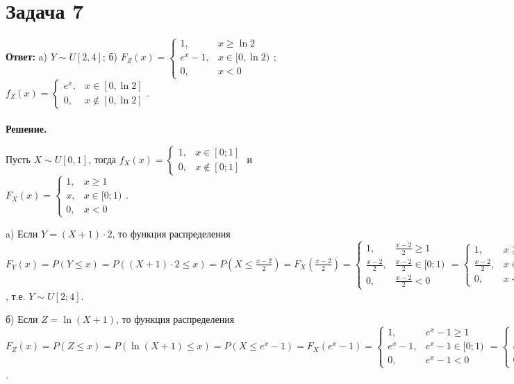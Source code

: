 \documentclass{article}
\begin{document}
\section*{Задача 7}
{\bf Ответ: } a) $Y\sim U[2,4]$; б) $F_Z(x)=\begin{cases}1,&x \geq \ln 2\\e^x-1,&x\in [0, \ln 2)\\0, &x < 0\end{cases}$; $f_Z(x)=\begin{cases}e^x,&x\in [0, \ln 2]\\0,&x \notin [0, \ln 2]\end{cases}$.
\\
\\
{\bf Решение.}
\par
Пусть $X\sim U[0,1]$, тогда $f_X(x)=\begin{cases}1,&x\in[0;1]\\0,&x\notin[0;1]\end{cases}$ и $F_X(x)=\begin{cases}1,&x\geq1\\x,&x\in[0;1)\\0,&x<0\end{cases}$.
\par
a) Если $Y=(X+1)\cdot 2$, то функция распределения $F_Y(x)=P(Y\leq x)=P((X+1)\cdot 2 \leq x)=P(X\leq \frac{x-2}{2})=F_X(\frac{x-2}{2})=\begin{cases}1,&\frac{x-2}{2}\geq 1\\\frac{x-2}{2},&\frac{x-2}{2}\in[0;1)\\0,&\frac{x-2}{2} < 0\end{cases}=\begin{cases}1,&x \geq 4\\\frac{x-2}{2},&x\in[2;4)\\0,&x < 2\end{cases}$, т.е. $Y\sim U[2;4]$.
\par
б) Если $Z=\ln(X+1)$, то функция распределения $F_Z(x)=P(Z \leq x)=P(\ln(X+1) \leq x)=P(X \leq e^x-1)=F_X(e^x-1)=\begin{cases}1,&e^x-1\geq 1\\e^x-1,&e^x-1 \in [0;1)\\0,&e^x-1 < 0\end{cases}=\begin{cases}1,&x \geq \ln 2\\e^x-1,&x\in [0, \ln 2)\\0, &x < 0\end{cases} \Rightarrow \text{плотность} f_Z(x)=\begin{cases}e^x,&x\in [0, \ln 2]\\0,&x \notin [0, \ln 2]\end{cases}$.
\end{document}
